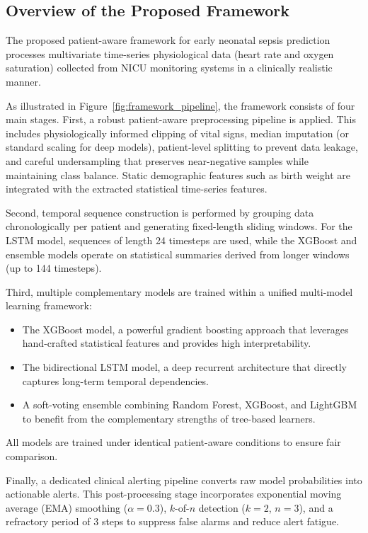 \documentclass[conference]{IEEEtran}
\begin{document}
\subsection{Overview of the Proposed Framework}
The proposed patient-aware framework for early neonatal sepsis prediction processes multivariate time-series physiological data (heart rate and oxygen saturation) collected from NICU monitoring systems in a clinically realistic manner.

As illustrated in Figure~\ref{fig:framework_pipeline}, the framework consists of four main stages. First, a robust patient-aware preprocessing pipeline is applied. This includes physiologically informed clipping of vital signs, median imputation (or standard scaling for deep models), patient-level splitting to prevent data leakage, and careful undersampling that preserves near-negative samples while maintaining class balance. Static demographic features such as birth weight are integrated with the extracted statistical time-series features.

Second, temporal sequence construction is performed by grouping data chronologically per patient and generating fixed-length sliding windows. For the LSTM model, sequences of length 24 timesteps are used, while the XGBoost and ensemble models operate on statistical summaries derived from longer windows (up to 144 timesteps).

Third, multiple complementary models are trained within a unified multi-model learning framework:
\begin{itemize}
    \item The XGBoost model, a powerful gradient boosting approach that leverages hand-crafted statistical features and provides high interpretability.
    \item The bidirectional LSTM model, a deep recurrent architecture that directly captures long-term temporal dependencies.
    \item A soft-voting ensemble combining Random Forest, XGBoost, and LightGBM to benefit from the complementary strengths of tree-based learners.
\end{itemize}

All models are trained under identical patient-aware conditions to ensure fair comparison.

Finally, a dedicated clinical alerting pipeline converts raw model probabilities into actionable alerts. This post-processing stage incorporates exponential moving average (EMA) smoothing ($\alpha=0.3$), $k$-of-$n$ detection ($k=2$, $n=3$), and a refractory period of 3 steps to suppress false alarms and reduce alert fatigue.
\end{document}
